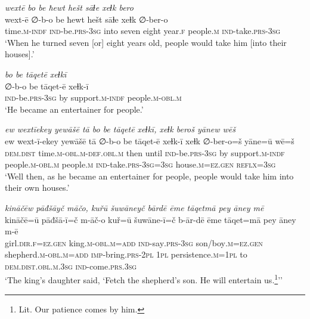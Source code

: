 \ea \label{KŠ.36}
\textit{wextē bo be ħewt hešt sāɫe xeɫk bero} \\ 
\gll wext-ē ∅-b-o be ħewt hešt sāɫe xeɫk ∅-ber-o \\ 
 time\textsc{.m}\textsc{-indf} \textsc{ind-}be\textsc{.prs}\textsc{-3sg} into seven eight year\textsc{.f} people\textsc{.m} \textsc{ind-}take\textsc{.prs}\textsc{-3sg} \\ 
\glt `When he turned seven [or] eight years old, people would take him [into their houses].'
\z 
 
\ea \label{KŠ.37}
\textit{bo be tāqetē xeɫkī} \\ 
\gll ∅-b-o be tāqet-ē xeɫk-ī \\ 
 \textsc{ind-}be\textsc{.prs}\textsc{-3sg} by support\textsc{.m}\textsc{-indf} people\textsc{.m}\textsc{-obl}\textsc{.m} \\ 
\glt `He became an entertainer for people.'
\z 
 
\ea \label{KŠ.38}
\textit{ew wextīekey yewāšē tā bo be tāqetē xeɫkī, xeɫk beroš yānew wēš} \\ 
\gll ew wext-ī-ekey yewāšē tā ∅-b-o be tāqet-ē xeɫk-ī xeɫk ∅-ber-o=š yāne=ū wē=š \\ 
 \textsc{dem.dist} time\textsc{.m}\textsc{-obl}\textsc{.m}\textsc{-def}\textsc{.obl}\textsc{.m} then until \textsc{ind-}be\textsc{.prs}\textsc{-3sg} by support\textsc{.m}\textsc{-indf} people\textsc{.m}\textsc{-obl}\textsc{.m} people\textsc{.m} \textsc{ind-}take\textsc{.prs}\textsc{-3sg}\textsc{=3sg} house\textsc{.m}\textsc{=ez.gen} \textsc{reflx}\textsc{=3sg} \\ 
\glt `Well then, as he became an entertainer for people, people would take him into their own houses.'
\z 
 
\ea \label{KŠ.40}
\textit{kināčēw pāđšāyč māčo, kuřū šuwāneyč bārdē ēme tāqetmā pey āney mē} \\ 
\gll kināčē=ū pāđšā-ī=č m-āč-o kuř=ū šuwāne-ī=č b-ār-dē ēme tāqet=mā pey āney m-ē \\ 
 girl\textsc{.dir}\textsc{.f}\textsc{=ez.gen} king\textsc{.m}\textsc{-obl}\textsc{.m}\textsc{=add} \textsc{ind-}say\textsc{.prs}\textsc{-3sg} son/boy\textsc{.m}\textsc{=ez.gen} shepherd\textsc{.m}\textsc{-obl}\textsc{.m}\textsc{=add} \textsc{imp-}bring\textsc{.prs}-\textsc{2pl} \textsc{1pl} persistence\textsc{.m}\textsc{=\textsc{1pl}} to \textsc{dem.dist}\textsc{.obl}\textsc{.m}\textsc{.3sg} \textsc{ind-}come\textsc{.prs}\textsc{.3sg} \\ 
\glt `The king’s daughter said, ‘Fetch the shepherd’s son. He will entertain us.\footnote{Lit. Our patience comes by him.}’'
\z 
 
